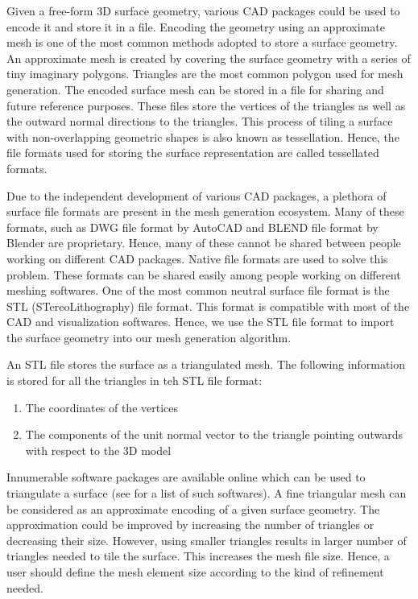 Given a free-form 3D surface geometry, various CAD packages could be used to encode it and store it in a file. Encoding the geometry using an approximate mesh is one of the most common methods adopted to store a surface geometry. An approximate mesh is created by covering the surface geometry with a series of tiny imaginary polygons. Triangles are the most common polygon used for mesh generation. The encoded surface mesh can be stored in a file for sharing and future reference purposes. These files store the vertices of the triangles as well as the outward normal directions to the triangles. This process of tiling a surface with non-overlapping geometric shapes is also known as tessellation. Hence, the file formats used for storing the surface representation are called tessellated formats.

Due to the independent development of various CAD packages, a plethora of surface file formats are present in the mesh generation ecosystem. Many of these formats, such as DWG file format by AutoCAD and BLEND file format by Blender are proprietary. Hence, many of these cannot be shared between people working on different CAD packages. Native file formats are used to solve this problem. These formats can be shared easily among people working on different meshing softwares. One of the most common neutral surface file format is the STL (STereoLithography) file format. This format is compatible with most of the CAD and visualization softwares. Hence, we use the STL file format to import the surface geometry into our mesh generation algorithm.

An STL file stores the surface as a triangulated mesh. The following information is stored for all the triangles in teh STL file format:

\begin{enumerate}
  \item The coordinates of the vertices
  \item The components of the unit normal vector to the triangle pointing outwards with respect to the 3D model
\end{enumerate}

Innumerable software packages are available online which can be used to triangulate a surface (see \cite{meshSoftware} for a list of such softwares). A fine triangular mesh can be considered as an approximate encoding of a given surface geometry. The approximation could be improved by increasing the number of triangles or decreasing their size. However, using smaller triangles results in larger number of triangles needed to tile the surface. This increases the mesh file size. Hence, a user should define the mesh element size according to the kind of refinement needed.

